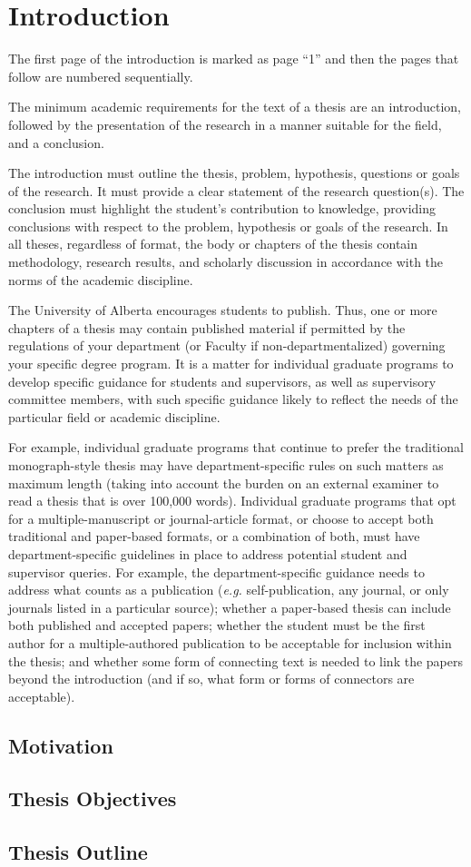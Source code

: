 \chapter{Introduction}\label{ch:Introduction}
  The first page of the introduction is marked as page ``1'' and then the pages that follow are numbered sequentially.

  The minimum academic requirements for the text of a thesis are an introduction, followed by the presentation of the research in a manner suitable for the field, and a conclusion.

  The introduction must outline the thesis, problem, hypothesis, questions or goals of the research.
  It must provide a clear statement of the research question(s).
  The conclusion must highlight the student’s contribution to knowledge, providing conclusions with respect to the problem, hypothesis or goals of the research.
  In all theses, regardless of format, the body or chapters of the thesis contain methodology, research results, and scholarly discussion in accordance with the norms of the academic discipline.

  The University of Alberta encourages students to publish.
  Thus, one or more chapters of a thesis may contain published material if permitted by the regulations of your department (or Faculty if non-departmentalized) governing your specific degree program.
  It is a matter for individual graduate programs to develop specific guidance for students and supervisors, as well as supervisory committee members, with such specific guidance likely to reflect the needs of the particular field or academic discipline.

  For example, individual graduate programs that continue to prefer the traditional monograph-style thesis may have department-specific rules on such matters as maximum length (taking into account the burden on an external examiner to read a thesis that is over 100,000 words).
  Individual graduate programs that opt for a multiple-manuscript or journal-article format, or choose to accept both traditional and paper-based formats, or a combination of both, must have department-specific guidelines in place to address potential student and supervisor queries.
  For example, the department-specific guidance needs to address what counts as a publication (\textit{e.g. } self-publication, any journal, or only journals listed in a particular source); whether a paper-based thesis can include both published and accepted papers; whether the student must be the first author for a multiple-authored publication to be acceptable for inclusion within the thesis; and whether some form of connecting text is needed to link the papers beyond the introduction (and if so, what form or forms of connectors are acceptable).

  \section{Motivation}\label{sec:Motivation}
    \lipsum[1-3]
  \section{Thesis Objectives}\label{sec:thesisObjective}
    \lipsum[14-16]
  \section{Thesis Outline}\label{sec:thesisOutline}
    \lipsum[17]
